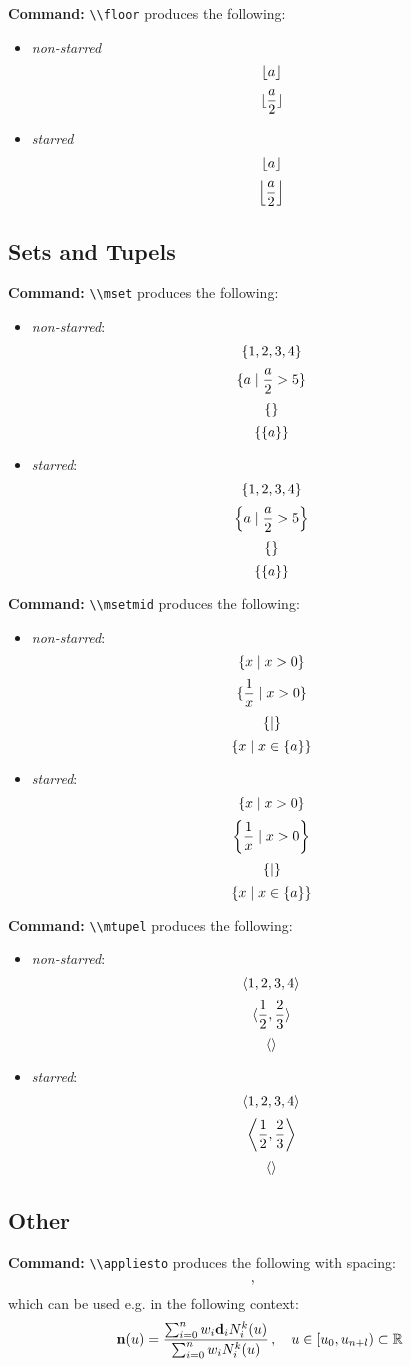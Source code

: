 \documentclass[10pt]{article}
\newcommand{\commandcmd}[1]{\par\noindent\textbf{Command:} \lstinline{\\#1}}
\begin{document}
\commandcmd{floor} produces the following:
\begin{itemize}
  \item \emph{non-starred}
        \[\floor{a}\]
        \[\floor{\frac{a}{2}}\]
  \item \emph{starred}
        \[\floor*{a}\]
        \[\floor*{\frac{a}{2}}\]
\end{itemize}

\subsection{Sets and Tupels}
\commandcmd{mset} produces the following:
\begin{itemize}
  \item \emph{non-starred}:
        \[\mset{1, 2, 3, 4}\]
        \[\mset{a \mid \frac{a}{2} > 5}\]
        \[\mset{}\]
        \[\mset{\mset{a}}\]
  \item \emph{starred}:
        \[\mset*{1, 2, 3, 4}\]
        \[\mset*{a \mid \frac{a}{2} > 5}\]
        \[\mset*{}\]
        \[\mset*{\mset*{a}}\]
\end{itemize}

\commandcmd{msetmid} produces the following:
\begin{itemize}
  \item \emph{non-starred}:
        \[\msetmid{x}{x > 0}\]
        \[\msetmid{\frac{1}{x}}{x > 0}\]
        \[\msetmid{}{}\]
        \[\msetmid{x}{x \in \mset{a}}\]
  \item \emph{starred}:
        \[\msetmid*{x}{x > 0}\]
        \[\msetmid*{\frac{1}{x}}{x > 0}\]
        \[\msetmid*{}{}\]
        \[\msetmid*{x}{x \in \mset{a}}\]
\end{itemize}

\commandcmd{mtupel} produces the following:
\begin{itemize}
  \item \emph{non-starred}:
        \[\mtupel{1, 2, 3, 4}\]
        \[\mtupel{\frac{1}{2}, \frac{2}{3}}\]
        \[\mtupel{}\]
  \item \emph{starred}:
        \[\mtupel*{1, 2, 3, 4}\]
        \[\mtupel*{\frac{1}{2}, \frac{2}{3}}\]
        \[\mtupel*{}\]
\end{itemize}

\subsection{Other}

\commandcmd{appliesto} produces the following with spacing:
\[\appliesto\]
which can be used e.g. in the following context:
\[\mathbf{n}(u) = \frac{\sum_{i = 0}^n w_i \mathbf{d}_i N_i^k(u)}{\sum_{i = 0}^n w_i N_i^k(u)} \appliesto u \in \left[u_0, u_{n + l}\right) \subset \mathbb{R}\]
\end{document}
